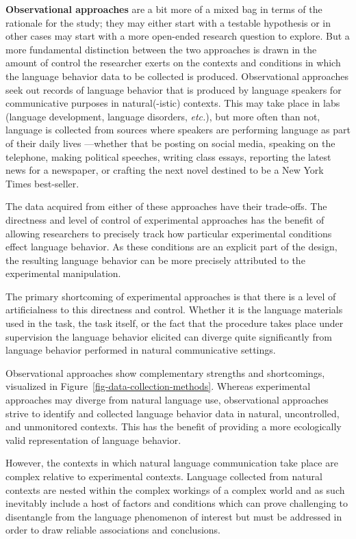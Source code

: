 \documentclass[
  letterpaper,
  krantz1]{latex/krantz-mod}
\theoremstyle{definition}
\theoremstyle{definition}
\theoremstyle{remark}
\begin{document}
\textbf{Observational approaches} are a
bit more of a mixed bag in terms of the rationale for the study; they
may either start with a testable hypothesis or in other cases may start
with a more open-ended research question to explore. But a more
fundamental distinction between the two approaches is drawn in the
amount of control the researcher exerts on the contexts and conditions
in which the language behavior data to be collected is produced.
Observational approaches seek out records of language behavior that is
produced by language speakers for communicative purposes in
natural(-istic) contexts. This may take place in labs (language
development, language disorders, \emph{etc.}), but more often than not,
language is collected from sources where speakers are performing
language as part of their daily lives ---whether that be posting on
social media, speaking on the telephone, making political speeches,
writing class essays, reporting the latest news for a newspaper, or
crafting the next novel destined to be a New York Times best-seller.

The data acquired from either of these approaches have their trade-offs.
The directness and level of control of experimental approaches has the
benefit of allowing researchers to precisely track how particular
experimental conditions effect language behavior. As these conditions
are an explicit part of the design, the resulting language behavior can
be more precisely attributed to the experimental manipulation.

The primary shortcoming of experimental approaches is that there is a
level of artificialness to this directness and control. Whether it is
the language materials used in the task, the task itself, or the fact
that the procedure takes place under supervision the language behavior
elicited can diverge quite significantly from language behavior
performed in natural communicative settings.

Observational approaches show complementary strengths and shortcomings,
visualized in Figure~\ref{fig-data-collection-methods}. Whereas
experimental approaches may diverge from natural language use,
observational approaches strive to identify and collected language
behavior data in natural, uncontrolled, and unmonitored contexts. This
has the benefit of providing a more ecologically valid representation of
language behavior.

However, the contexts in which natural language communication take place
are complex relative to experimental contexts. Language collected from
natural contexts are nested within the complex workings of a complex
world and as such inevitably include a host of factors and conditions
which can prove challenging to disentangle from the language phenomenon
of interest but must be addressed in order to draw reliable associations
and conclusions.
\end{document}
